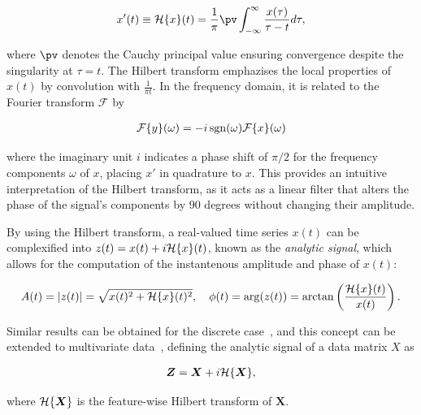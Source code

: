 \begin{align}\label{eq:theory:hilbert_transform_time}
x'(t) \equiv \HT{x}(t) = \frac{1}{\pi} \pv \int_{-\infty}^{\infty} \frac{x(\tau)}{\tau - t} d\tau,
\end{align}

where $\pv$ denotes the Cauchy principal value ensuring convergence despite the singularity at $\tau=t$. The Hilbert transform emphazises the local properties of $x(t)$ by convolution with $\frac{1}{\pi t}$. In the frequency domain, it is related to the Fourier transform $\mathcal{F}$ by

\begin{align}\label{eq:theory:hilbert_transform_frequency}
    \mathcal{F}\{y\}(\omega) = -i \operatorname*{sgn} (\omega) \mathcal{F}\{x\}(\omega)
\end{align}

where the imaginary unit $i$ indicates a phase shift of $\pi/2$ for the frequency components $\omega$ of $x$, placing $x'$ in quadrature to $x$. This provides an intuitive interpretation of the Hilbert transform, as it acts as a linear filter that alters the phase of the signal's components by 90 degrees without changing their amplitude.

By using the Hilbert transform, a real-valued time series $x(t)$ can be complexified into $z(t) = x(t) + i \mathcal{H}\{x\}(t)$, known as the \textit{analytic signal}, which allows for the computation of the instantenous amplitude and phase of $x(t)$:

\begin{align}
    A(t) = |z(t)| = \sqrt{x(t)^2 + \mathcal{H}\{x\}(t)^2}, \quad \phi(t) = \arg(z(t)) = \arctan \left( \frac{\mathcal{H}\{x\}(t)}{x(t)} \right).
\end{align}

Similar results can be obtained for the discrete case~\cite[][pp. 942-956]{oppenheim_discrete-time_2010}, and this concept can be extended to multivariate data~\cite[e.g.][pp. 105-106]{hannachi_patterns_2021}, 
defining the analytic signal of a data matrix $X$ as

\begin{align}
    \bm{Z} = \bm{X} + i \mathcal{H}\{\bm{X}\},
\end{align}

where $\mathcal{H}\{\bm{X}\}$ is the feature-wise Hilbert transform of $\bm{X}$. 



